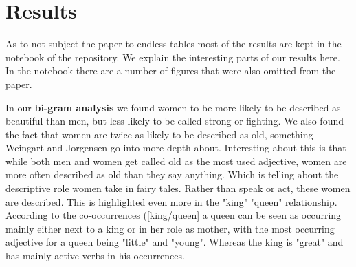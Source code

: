 \documentclass[11pt]{article}
\begin{document}
\section{Results}

As to not subject the paper to endless tables most of the results are kept in the notebook of the repository. We explain the interesting parts of our results here. In the notebook there are a number of figures that were also omitted from the paper. 

In our \textbf{bi-gram analysis} we found women to be more likely to be described as beautiful than men, but less likely to be called strong or fighting. We also found the fact that women are twice as likely to be described as old, something Weingart and Jorgensen go into more depth about. Interesting about this is that while both men and women get called old as the most used adjective, women are more often described as old than they say anything. Which is telling about the descriptive role women take in fairy tales. Rather than speak or act, these women are described. This is highlighted even more in the "king" "queen" relationship. According to the co-occurrences (\ref{king/queen} a queen can be seen as occurring mainly either next to a king or in her role as mother, with the most occurring adjective for a queen being "little" and "young". Whereas the king is "great" and has mainly active verbs in his occurrences.
\end{document}

